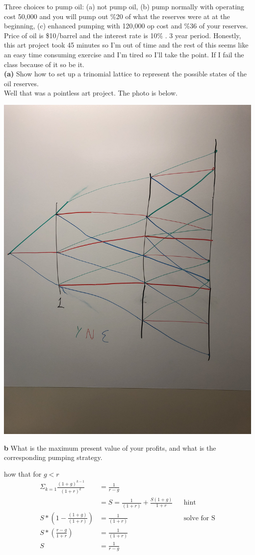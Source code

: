 \documentclass[12pt]{article}
\newenvironment{problem}[3][Problem]{\begin{trivlist}
\item[\hskip \labelsep {\bfseries #1}\hskip \labelsep {\bfseries #2.}]}{\end{trivlist}}
\begin{document}
\begin{problem}9. Three choices to pump oil: (a) not pump oil, (b) pump normally with operating cost 50,000 and you will pump out \%20 of what the reserves were at at the beginning, (c) enhanced pumping with 120,000 op cost and \%36 of your reserves. Price of oil is \$10/barrel and the interest rate is 10\% . 3 year period. Honestly, this art project took 45 minutes so I'm out of time and the rest of this seems like an easy time consuming exercise and I'm tired so I'll take the point. If I fail the class because of it so be it.  \\
\textbf{(a)} Show how to set up a trinomial lattice to represent the possible states of the oil reserves.\\
Well that was a pointless art project. The photo is below. \\
\begin{center}
\includegraphics[width=0.59\linewidth]{mod4p9.jpg}
\end{center}

\textbf{b} What is the maximum present value of your profits, and what is the corresponding pumping strategy. 
\end{problem}


\begin{problem}{11} Show that for $ g<r $
\begin{align*}
\Sigma_{k=1}\frac{(1+g)^{k-1}}{(1+r)^k} &= \frac{1}{r-g} \\
&= S = \frac{1}{(1+r)}+\frac{S(1+g)}{1+r} &&\text{hint} \\
S*(1-\frac{(1+g)}{(1+r)}) &= \frac{1}{(1+r)} && \text{solve for S} \\ 
S*(\frac{r-g}{1+r}) &=  \frac{1}{(1+r)} \\ 
S &= \frac{1}{r-g} 
\end{align*}

\end{problem}
\end{document}
